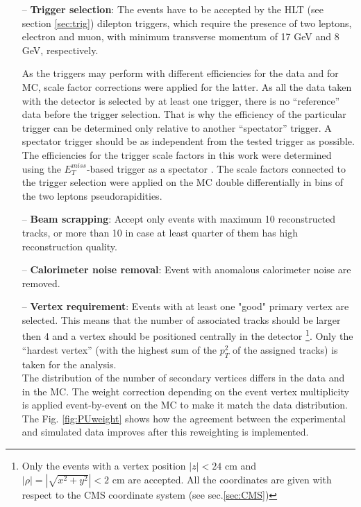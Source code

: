 \begin{itemize}
 \item [--] \textbf{Trigger selection}: The events have to be accepted by the HLT (see section \ref{sec:trig}) dilepton triggers, which require the presence of two leptons, electron and muon, with
 minimum transverse momentum of 17 GeV and 8 GeV, respectively.
 
 As the triggers may perform with different efficiencies for the data and for MC, scale factor corrections were applied for the latter. As all the data taken with 
 the detector is selected by at least one trigger, there is no ``reference'' data before the trigger selection. That is why the efficiency of the particular trigger 
 can be determined only relative to another ``spectator'' trigger. A spectator trigger should be as independent from the tested trigger as possible. The efficiencies 
 for the trigger scale factors in this work were determined using the $E_{T}^{miss}$-based trigger as a spectator \cite{Asin2014Auth}. The scale factors connected 
 to the trigger selection were applied on the MC double differentially in bins of the two leptons pseudorapidities. 
 \item [--] \textbf{Beam scrapping}: Accept only events with maximum 10 reconstructed tracks, or more than 10 in case at least quarter of them has high reconstruction 
 quality.
 \item [--] \textbf{Calorimeter noise removal}: Event with anomalous calorimeter noise are removed.
 \item [--] \textbf{Vertex requirement}: Events with at least one "good" primary vertex are selected.
 This means that the number of associated tracks should be larger then 4 and a vertex should be positioned centrally in the detector
 \footnote{Only the events with a vertex position $|z| < \textrm{24 cm}$ and $|\rho| = |\sqrt{x^{2} + y^{2}}| < \textrm{2 cm}$ are accepted. All the coordinates
 are given with respect to the CMS coordinate system (see sec.\ref{sec:CMS})}. Only the ``hardest vertex'' 
 (with the highest sum of the $p_{T}^{2}$ of the assigned tracks) is taken for the analysis. 
 \\
 The distribution of the number of secondary vertices differs in the data and in the MC. The weight correction depending on the event vertex multiplicity is applied
 event-by-event on the MC to make it match the data distribution.
 The Fig. \ref{fig:PUweight} shows how the agreement
 between the experimental and simulated data improves after this reweighting is implemented.
 

\end{itemize}
